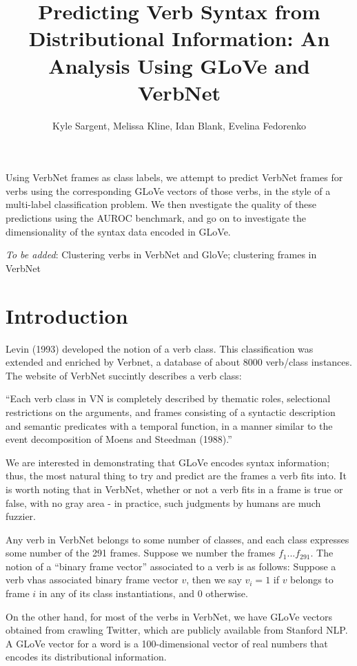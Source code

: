 \documentclass[a4paper]{article}
\title{Predicting Verb Syntax from Distributional Information: An Analysis Using GLoVe and VerbNet}
\author{Kyle Sargent, Melissa Kline, Idan Blank, Evelina Fedorenko}
\renewenvironment{abstract}
{\small
	\begin{center}
		\bfseries \abstractname\vspace{-.5em}\vspace{0pt}
	\end{center}
	\list{}{
		\setlength{\leftmargin}{.5cm}%
		\setlength{\rightmargin}{\leftmargin}%
	}%
	\item\relax}
{\endlist}
\begin{document}
\twocolumn
\maketitle

\begin{abstract}
Using VerbNet frames as class labels, we attempt to predict VerbNet frames for verbs using the corresponding GLoVe vectors of those verbs, in the style of a multi-label classification problem. We then nvestigate the quality of these predictions using the AUROC benchmark, and go on to investigate the dimensionality of the syntax data encoded in GLoVe.

\textit{To be added}: Clustering verbs in VerbNet and GloVe; clustering frames in VerbNet
\end{abstract}

\section{Introduction}
Levin (1993) developed the notion of a verb class. This classification was extended and enriched by Verbnet, a database of about 8000 verb/class instances. The website of VerbNet succintly describes a verb class:

\begin{displayquote}
“Each verb class in VN is completely described by thematic roles, selectional restrictions on the arguments, and frames consisting of a syntactic description and semantic predicates with a temporal function, in a manner similar to the event decomposition of Moens and Steedman (1988).”
\end{displayquote}

We are interested in demonstrating that GLoVe encodes syntax information; thus, the most natural thing to try and predict are the frames a verb fits into. It is worth noting that in VerbNet, whether or not a verb fits in a frame is true or false, with no gray area - in practice, such judgments by humans are much fuzzier. 

Any verb in VerbNet belongs to some number of classes, and each class expresses some number of the 291 frames. Suppose we number the frames $f_1... f_{291}$. The notion of a “binary frame vector” associated to a verb is as follows: Suppose a verb vhas associated binary frame vector $v$, then we say 
$v_i =1$ if $v$ belongs to frame $i$ in any of its class instantiations, and 0 otherwise.

On the other hand, for most of the verbs in VerbNet, we have GLoVe vectors obtained from crawling Twitter, which are publicly available from Stanford NLP. A GLoVe vector for a word is a 100-dimensional vector of real numbers that encodes its distributional information.
\end{document}
